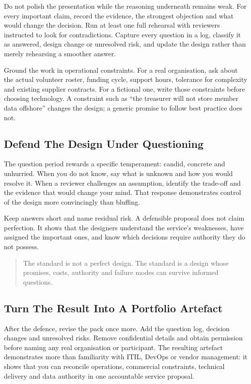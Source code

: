 Do not polish the presentation while the reasoning underneath remains weak. For every important claim, record the evidence, the strongest objection and what would change the decision. Run at least one full rehearsal with reviewers instructed to look for contradictions. Capture every question in a log, classify it as answered, design change or unresolved risk, and update the design rather than merely rehearsing a smoother answer.


Ground the work in operational constraints. For a real organisation, ask about the actual volunteer roster, funding cycle, support hours, tolerance for complexity and existing supplier contracts. For a fictional one, write those constraints before choosing technology. A constraint such as ``the treasurer will not store member data offshore'' changes the design; a generic promise to follow best practice does not.



\subsection{Defend The Design Under Questioning}


The question period rewards a specific temperament: candid, concrete and unhurried. When you do not know, say what is unknown and how you would resolve it. When a reviewer challenges an assumption, identify the trade-off and the evidence that would change your mind. That response demonstrates control of the design more convincingly than bluffing.


Keep answers short and name residual risk. A defensible proposal does not claim perfection. It shows that the designers understand the service's weaknesses, have assigned the important ones, and know which decisions require authority they do not possess.



\begin{quote}\small
The standard is not a perfect design. The standard is a design whose promises, costs, authority and failure modes can survive informed questions.
\end{quote}



\subsection{Turn The Result Into A Portfolio Artefact}


After the defence, revise the pack once more. Add the question log, decision changes and unresolved risks. Remove confidential details and obtain permission before naming any real organisation or participant. The resulting artefact demonstrates more than familiarity with ITIL, DevOps or vendor management: it shows that you can reconcile operations, commercial constraints, technical delivery and data authority in one accountable service proposal.


